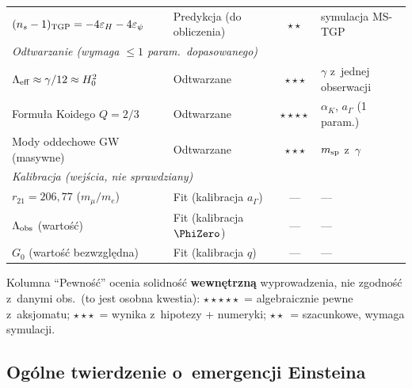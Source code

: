 \begin{center}
\begin{tabular}{@{}p{4.5cm}lcp{3.5cm}@{}}
$(n_s - 1)_{\rm TGP} = -4\varepsilon_H - 4\varepsilon_\psi$
  & Predykcja (do obliczenia) & $\star\star$
  & symulacja MS-TGP \\[8pt]

\multicolumn{4}{l}{\textit{Odtwarzanie (wymaga $\leq 1$ param.\ dopasowanego)}} \\[2pt]

$\Lambda_{\rm eff} \approx \gamma/12 \approx H_0^2$
  & Odtwarzane & $\star\star\star$
  & $\gamma$ z~jednej obserwacji \\[3pt]

Formu\l{}a Koidego $Q = 2/3$
  & Odtwarzane & $\star\star\star\star$
  & $\alpha_K$, $a_\Gamma$ (1 param.) \\[3pt]

Mody oddechowe GW (masywne)
  & Odtwarzane & $\star\star\star$
  & $m_{\rm sp}$ z~$\gamma$ \\[8pt]

\multicolumn{4}{l}{\textit{Kalibracja (wej\'scia, nie sprawdziany)}} \\[2pt]

$r_{21} = 206{,}77$ ($m_\mu/m_e$)
  & Fit (kalibracja $a_\Gamma$) & ---
  & --- \\[3pt]

$\Lambda_{\rm obs}$ (warto\'s\'c)
  & Fit (kalibracja $\PhiZero$) & ---
  & --- \\[3pt]

$G_0$ (warto\'s\'c bezwzgl\k{e}dna)
  & Fit (kalibracja $q$) & ---
  & --- \\

\bottomrule
\end{tabular}
\end{center}

\begin{remark}\label{rem:stars-meaning}
Kolumna ``Pewno\'s\'c'' ocenia solidno\'s\'c \textbf{wewn\k{e}trzn\k{a}} wyprowadzenia,
nie zgodno\'s\'c z~danymi obs.\ (to jest osobna kwestia):
$\star\star\star\star\star$~= algebraicznie pewne z~aksjomatu;
$\star\star\star$~= wynika z~hipotezy + numeryki;
$\star\star$~= szacunkowe, wymaga symulacji.
\end{remark}


\subsection{Og\'olne twierdzenie o~emergencji Einsteina}\label{ssec:general-emergence}

